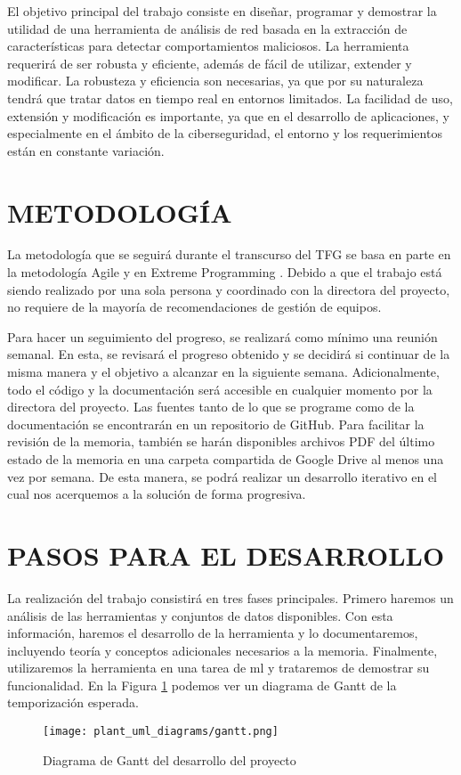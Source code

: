 El objetivo principal del trabajo consiste en diseñar, programar y demostrar la utilidad de una herramienta de análisis de red basada en la extracción de características para detectar comportamientos maliciosos. La herramienta requerirá de ser robusta y eficiente, además de fácil de utilizar, extender y modificar. La robusteza y eficiencia son necesarias, ya que por su naturaleza tendrá que tratar datos en tiempo real en entornos limitados. La facilidad de uso, extensión y modificación es importante, ya que en el desarrollo de aplicaciones, y especialmente en el ámbito de la ciberseguridad, el entorno y los requerimientos están en constante variación.

\section*{METODOLOGÍA}

La metodología que se seguirá durante el transcurso del TFG se basa en parte en la metodología Agile y en Extreme Programming \cite{extremeprogramming}. Debido a que el trabajo está siendo realizado por una sola persona y coordinado con la directora del proyecto, no requiere de la mayoría de recomendaciones de gestión de equipos. 

Para hacer un seguimiento del progreso, se realizará como mínimo una reunión semanal. En esta, se revisará el progreso obtenido y se decidirá si continuar de la misma manera y el objetivo a alcanzar en la siguiente semana. Adicionalmente, todo el código y la documentación será accesible en cualquier momento por la directora del proyecto. Las fuentes tanto de lo que se programe como de la documentación se encontrarán en un repositorio de GitHub. Para facilitar la revisión de la memoria, también se harán disponibles archivos PDF del último estado de la memoria en una carpeta compartida de Google Drive al menos una vez por semana. De esta manera, se podrá realizar un desarrollo iterativo en el cual nos acerquemos a la solución de forma progresiva.

\section*{PASOS PARA EL DESARROLLO}

La realización del trabajo consistirá en tres fases principales. Primero haremos un análisis de las herramientas y conjuntos de datos disponibles. Con esta información, haremos el desarrollo de la herramienta y lo documentaremos, incluyendo teoría y conceptos adicionales necesarios a la memoria. Finalmente, utilizaremos la herramienta en una tarea de \gls{ml} y trataremos de demostrar su funcionalidad. En la Figura \ref{fig:gantt} podemos ver un diagrama de Gantt de la temporización esperada.

\begin{figure}[H]
  \begin{center}
    \texttt{[image: plant\_uml\_diagrams/gantt.png]}
  \end{center}
  \caption{Diagrama de Gantt del desarrollo del proyecto}\label{fig:gantt}
\end{figure}